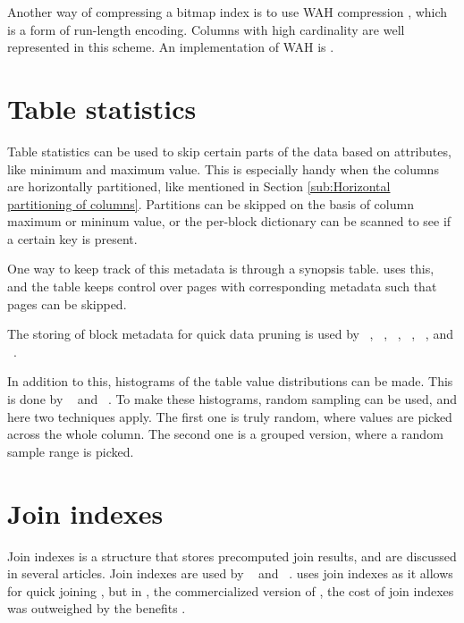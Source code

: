 Another way of compressing a bitmap index is to use WAH compression \cite{Bjorklund2011-wh}, which is a form of run-length encoding. Columns with high cardinality are well represented in this scheme. An implementation of WAH is .


\section{Table statistics}
\label{sec:Metadata indexes}
Table statistics can be used to skip certain parts of the data based on attributes, like minimum and maximum value. This is especially handy when the columns are horizontally partitioned, like mentioned in Section \ref{sub:Horizontal partitioning of columns}. Partitions can be skipped on the basis of column maximum or mininum value, or the per-block dictionary can be scanned to see if a certain key is present.

One way to keep track of this metadata is through a synopsis table. \ibm uses this, and the table keeps control over pages with corresponding metadata such that pages can be skipped.

The storing of block metadata for quick data pruning is used by \oracle~\cite{Lahiri2015-mz}, \ibm~\cite{Roman2013-em}, \vertica~\cite{Lamb2012-kg}, \monetx~\cite{Boncz2005-wj}, \mssql~\cite{Larson2013-mc}, and \exasol~\cite{Exasol2014-xh}.

In addition to this, histograms of the table value distributions can be made. This is done by \ibm~\cite{Raman2013-em, Raman2008-gi} and \mssql~\cite{Larson2013-mc}. To make these histograms, random sampling can be used, and here two techniques apply. The first one is truly random, where values are picked across the whole column. The second one is a grouped version, where a random sample range is picked.

\section{Join indexes}
\label{sec:Join indexes}
Join indexes is a structure that stores precomputed join results, and are discussed in several articles. Join indexes are used by \monetdb~\cite{Boncz2002-yj} and \monetx~\cite{Boncz2005-wj}.  \cstore uses join indexes as it allows for quick joining \cite{Stonebraker2005-qz}, but in \vertica, the commercialized version of \cstore, the cost of join indexes was outweighed by the benefits \cite{Lamb2012-kg}.

